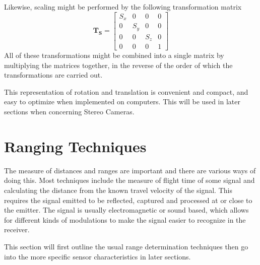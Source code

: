 Likewise, scaling might be performed by the following transformation matrix
\begin{equation}
    \label{chap2:eq-TransformationMatrixScaling}
    \mathbf{T_S} = \left [ \begin{array}{cccc}
                                S_x & 0 & 0 & 0 \\
                                0 & S_y & 0 & 0 \\
                                0 & 0 & S_z & 0 \\
                                0 & 0 & 0 & 1 
                                 \end{array} \right]
\end{equation}
All of these transformations might be combined into a single matrix by multiplying the
matrices together, in the reverse of the order of which the transformations are carried
out. 

This representation of rotation and translation is convenient and compact, and easy to
optimize when implemented on computers. This will be used in later sections when
concerning Stereo Cameras. 


\section{Ranging Techniques}
The measure of distances and ranges are important and there are various ways of doing
this. Most techniques include the measure of flight time of some signal and calculating
the distance from the known travel velocity of the signal. This requires the signal
emitted to be reflected, captured and processed at or close to the emitter. The signal is
usually electromagnetic or sound based, which allows for different kinds of modulations to
make the signal easier to recognize in the receiver.


This section will first outline the usual range determination techniques then go into the
more specific sensor characteristics in later sections.


